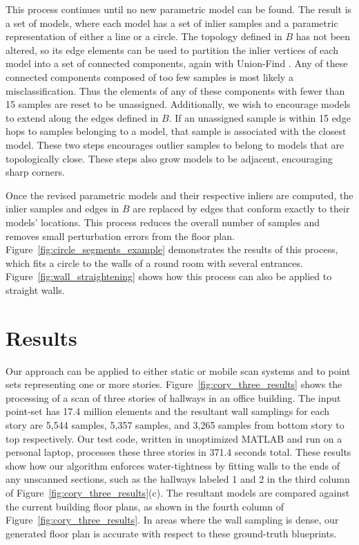 \documentclass[10pt,twocolumn,letterpaper]{article}
\begin{document}
This process continues until no new parametric model can be found.  The result is a set of models, where each model has a set of inlier samples and a parametric representation of either a line or a circle.  The topology defined in $B$ has not been altered, so its edge elements can be used to partition the inlier vertices of each model into a set of connected components, again with Union-Find \cite{Unionfind}.  Any of these connected components composed of too few samples is most likely a misclassification.  Thus the elements of any of these components with fewer than 15 samples are reset to be unassigned.  Additionally, we wish to encourage models to extend along the edges defined in $B$.  If an unassigned sample is within 15 edge hops to samples belonging to a model, that sample is associated with the closest model.  These two steps encourages outlier samples to belong to models that are topologically close.  These steps also grow models to be adjacent, encouraging sharp corners.

Once the revised parametric models and their respective inliers are computed, the inlier samples and edges in $B$ are replaced by edges that conform exactly to their models' locations.  This process reduces the overall number of samples and removes small perturbation errors from the floor plan.  Figure~\ref{fig:circle_segments_example} demonstrates the results of this process, which fits a circle to the walls of a round room with several entrances. Figure~\ref{fig:wall_straightening} shows how this process can also be applied to straight walls.

\section{Results}
\label{sec:results}

Our approach can be applied to either static or mobile scan systems and to point sets representing one or more stories.  Figure~\ref{fig:cory_three_results} shows the processing of a scan of three stories of hallways in an office building.  The input point-set has 17.4 million elements and the resultant wall samplings for each story are 5,544 samples, 5,357 samples, and 3,265 samples from bottom story to top respectively.  Our test code, written in unoptimized MATLAB and run on a personal laptop, processes these three stories in 371.4 seconds total.  These results show how our algorithm enforces water-tightness by fitting walls to the ends of any unscanned sections, such as the hallways labeled 1 and 2 in the third column of Figure~\ref{fig:cory_three_results}(c).  The resultant models are compared against the current building floor plans, as shown in the fourth column of Figure~\ref{fig:cory_three_results}.  In areas where the wall sampling is dense, our generated floor plan is accurate with respect to these ground-truth blueprints.
\end{document}
